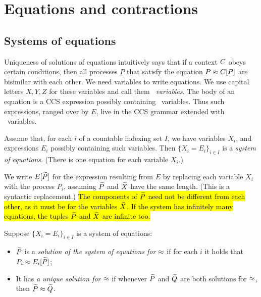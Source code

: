 \section{Equations and contractions}
\label{s:eq}

\subsection{Systems of  equations}
\label{ss:SysEq}

Uniqueness of  solutions of equations \cite{Mil89} intuitively says that if  a context $C$ obeys
certain  conditions, 
then all processes $P$  that satisfy the equation $ P \approx C [P]$ are
bisimilar with each other.
We need variables to write equations. We use capital letters $X,Y,Z$
for these variables and call them \emph{\behav\  variables}.
The body of an equation is a CCS expression
possibly containing \behav\  variables. Thus such expressions, ranged
over by $E$, live in the CCS grammar extended with \behav\  variables.

\begin{definition}
Assume that, for each $i$ of 
 a countable indexing set $I$, we have variables $X_i$, and expressions
$E_i$ possibly containing  such variables. 
Then 
$\{  X_i = E_i\}_{i\in I}$
is 
  a \emph{system of equations}. (There is one equation for each variable $X_i$.)
\end{definition}

We write $E[\widetilde P]$ for the expression resulting from $E$ by
replacing each variable $X_i$   with the process $P_i$, assuming
$\widetilde P$ and $\widetilde X$ have the same length. (This is a syntactic
replacement.) 
\hl{The components of $\widetilde P$ need not be
different from each other, as it must be for the variables $\widetilde X$.
If the system has infinitely many equations,
the  tuples $\widetilde P$ and $\widetilde X$
are infinite too.}
\begin{definition}
Suppose  $\{  X_i = E_i\}_{i\in I}$ is a system of equations: 
\begin{itemize}
\item
 $\widetilde P$ is a \emph{solution of the 
system of equations  for $\approx$} 
if for each $i$ it holds
that $P_i \approx E_i [\widetilde P]$;

\item It %
 has \emph{a unique solution for $\approx$}  if whenever 
 $\widetilde P$ and $\widetilde Q$ are both solutions for $\approx$, then $\widetilde P \approx
 \widetilde Q$. 
\end{itemize} 
 \end{definition} 

